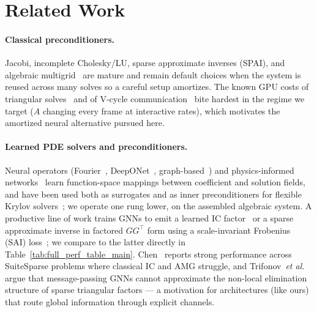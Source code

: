 \documentclass[acmtog]{acmart}
\theoremstyle{plain}
\begin{document}
\section{Related Work}
\label{sec:related}

\paragraph{Classical preconditioners.}
Jacobi, incomplete Cholesky/LU, sparse approximate inverses (SPAI), and algebraic
multigrid~\cite{saad2003iterative,lin1999incomplete,kolotilina1993factorized,benzi1996sparse,ruge1987algebraic,naumov2015amgx}
are mature and remain default choices when the system is reused across many solves so a
careful setup amortizes. The known GPU costs of triangular
solves~\cite{liu2016synchronization,yamazaki2020performance} and of V-cycle
communication~\cite{naumov2015amgx} bite hardest in the regime we target
($A$ changing every frame at interactive rates), which motivates the amortized neural
alternative pursued here.

\paragraph{Learned PDE solvers and preconditioners.}
Neural operators (Fourier~\cite{li2021fourier}, DeepONet~\cite{lu2021learning},
graph-based~\cite{li2020neural,li2020multipole}) and physics-informed
networks~\cite{raissi2019physics} learn function-space mappings between coefficient and
solution fields, and have been used both as surrogates and as inner preconditioners for
flexible Krylov solvers~\cite{rudikov2024neural}; we operate one rung lower, on the
assembled algebraic system. A productive line of work trains GNNs to emit a learned IC
factor~\cite{Li2023learning,hausner2023neural,trifonov2024linear} or a sparse approximate
inverse in factored $GG^\top$ form using a scale-invariant Frobenius (SAI)
loss~\cite{Yang2025sparse}; we compare to the latter directly in
Table~\ref{tab:full_perf_table_main}. Chen~\cite{chen2024gnp} reports strong performance
across SuiteSparse problems where classical IC and AMG struggle, and
Trifonov~\emph{et al.}~\cite{trifonov2025gnn} argue that message-passing GNNs cannot
approximate the non-local elimination structure of sparse triangular factors --- a
motivation for architectures (like ours) that route global information through explicit
channels.
\end{document}
